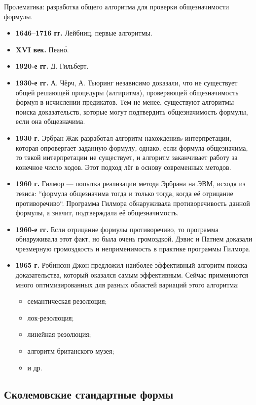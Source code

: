 \documentclass[a4paper,12pt]{report}
\begin{document}
	Пролематика: разработка общего алгоритма для проверки общезначимости формулы.
	\begin{itemize}
		\item \textbf{1646–1716 гг.} Лейбниц, первые алгоритмы.
		\item \textbf{XVI век.} Пеано́.
		\item \textbf{1920-е гг.} Д. Гильберт.
		\item \textbf{1930-е гг.} А. Чёрч, А. Тьюринг независимо доказали, что не
			существует общей решающей процедуры (алгиритма), проверяющей
			общезначимость формул в исчислении предикатов. Тем не менее, существуют
			алгоритмы поиска доказательств, которые могут подтвердить общезначимость
			формулы, если она общезначима.
		\item \textbf{1930 г.} Эрбран Жак разработал алгоритм нахожденияs
			интерпретации, которая опровергает заданную формулу, однако, если формула
			общезначима, то такой интерпретации не существует, и алгоритм заканчивает
			работу за конечное число ходов. Этот подход лёг в основу современных
			методов.
		\item \textbf{1960 г.} Гилмор — попытка реализации метода Эрбрана на ЭВМ,
			исходя из тезиса: ``формула общезначима тогда и только тогда, когда её
			отрицание противоречиво``. Программа Гилмора обнаруживала
			противоречивость данной формулы, а значит, подтверждала её
			общезначимость.
		\item \textbf{1960-е гг.} Если отрицание формулы противоречиво, то
			программа обнаруживала этот факт, но была очень громоздкой. Дэвис и
			Патнем доказали чрезмерную громоздкость и неприменимость в практике
			программы Гилмора.
		\item \textbf{1965 г.} Робинсон Джон предложил наиболее эффективный
			алгоритм поиска доказательства, который оказался самым эффективным.
			Сейчас применяются много оптимизированных для разных областей вариаций
			этого алгоритма:
			\begin{itemize}
				\item семантическая резолюция;
				\item лок-резолюция;
				\item линейная резолюция;
				\item алгоритм британского музея;
				\item и др.
			\end{itemize}
	\end{itemize}


\subsection{Сколемовские стандартные формы}
\end{document}
